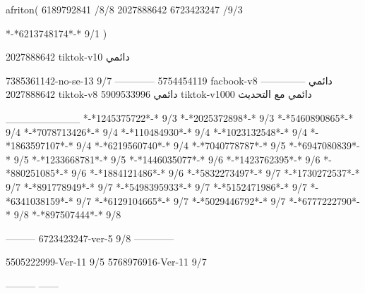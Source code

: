 afriton(
6189792841 /8/8
2027888642
6723423247 /9/3

*-*6213748174*-* 9/1
)

2027888642 tiktok-v10
دائمي


7385361142-no-se-13
9/7
------------
5754454119 facbook-v8
دائمي
--------------
2027888642 tiktok-v8
دائمي
5909533996 tiktok-v1000
دائمي مع التحديث

__________
*-*1245375722*-* 9/3
*-*2025372898*-* 9/3
*-*5460890865*-* 9/4
*-*7078713426*-* 9/4
*-*110484930*-* 9/4
*-*1023132548*-* 9/4
*-*1863597107*-* 9/4
*-*6219560740*-* 9/4
*-*7040778787*-* 9/5
*-*6947080839*-* 9/5
*-*1233668781*-* 9/5
*-*1446035077*-* 9/6
*-*1423762395*-* 9/6
*-*880251085*-* 9/6
*-*1884121486*-* 9/6
*-*5832273497*-* 9/7
*-*1730272537*-* 9/7
*-*891778949*-* 9/7
*-*5498395933*-* 9/7
*-*5152471986*-* 9/7
*-*6341038159*-* 9/7
*-*6129104665*-* 9/7
*-*5029446792*-* 9/7
*-*6777222790*-* 9/8
*-*897507444*-* 9/8

---------
6723423247-ver-5 9/8
------------

5505222999-Ver-11
9/5
5768976916-Ver-11
9/7

---------
------
